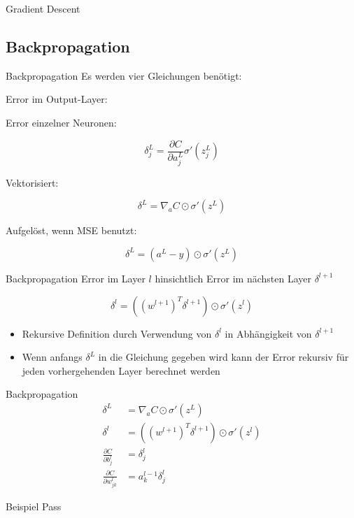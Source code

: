 \begin{frame}{Gradient Descent}
  
\end{frame}

\subsection{Backpropagation}%
\label{sec:backprop}

\begin{frame}{Backpropagation}
  Es werden vier Gleichungen benötigt:

  Error im Output-Layer:

  Error einzelner Neuronen:

  \[\delta_j^L = \frac{\partial C}{\partial a_j^L} \sigma' \left(z_j^L\right)\]

  Vektorisiert:

  \[\delta^L = \nabla_aC \odot \sigma'(z^L)\]

  Aufgelöst, wenn MSE benutzt:

  \[\delta^L = (a^L - y) \odot \sigma'(z^L)\]
\end{frame}

\begin{frame}{Backpropagation}
  Error im Layer \(l\) hinsichtlich Error im nächsten Layer \(\delta^{l+1}\)

  \[\delta^l = \left(\left(w^{l+1}\right)^T\delta^{l+1}\right) \odot
    \sigma'\left(z^l\right)\]

  \begin{itemize}
  \item Rekursive Definition durch Verwendung von \(\delta^l\) in Abhängigkeit
    von \(\delta^{l+1}\)
  \item Wenn anfangs \(\delta^L\) in die Gleichung gegeben wird kann der Error
    rekursiv für jeden vorhergehenden Layer berechnet werden
  \end{itemize}
\end{frame}

\begin{frame}{Backpropagation}
  \begin{align*}
    \delta^L &= \nabla_aC \odot \sigma' \left(z^L\right)\\[1em]
    \delta^l &= \left(\left(w^{l+1}\right)^T \delta^{l+1}\right) \odot
               \sigma'\left(z^l\right)\\[1em]
    \frac{\partial C}{\partial b^l_j} &= \delta^l_j\\[1em]
    \frac{\partial C}{\partial w^l_{jk}} &= a^{l-1}_k\delta^l_j
  \end{align*}
\end{frame}

\begin{frame}{Beispiel}
  Pass
\end{frame}


